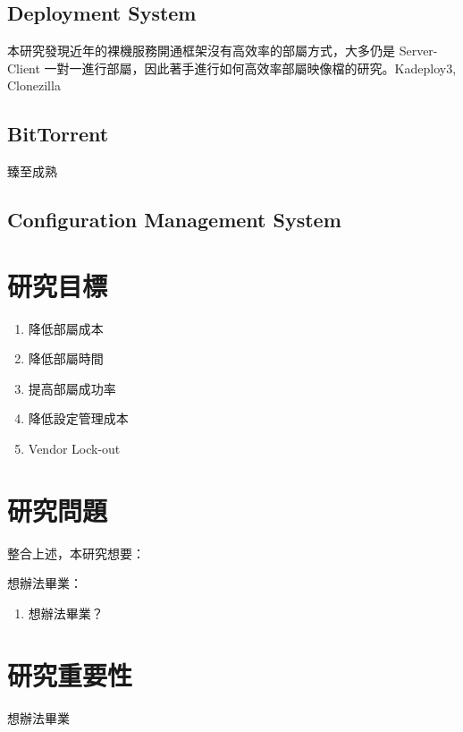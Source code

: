 \subsection{Deployment System}
本研究發現近年的裸機服務開通框架\cite{chandrasekar2014comparative}沒有高效率的部屬方式，大多仍是 Server-Client 一對一進行部屬，因此著手進行如何高效率部屬映像檔的研究。Kadeploy3\cite{kadeploy3}, Clonezilla\cite{shiau2008clonezilla}
\subsection{BitTorrent}
臻至成熟
\subsection{Configuration Management System}

\section{研究目標}
\begin{enumerate}
\item 降低部屬成本
\item 降低部屬時間
\item 提高部屬成功率
\item 降低設定管理成本
\item Vendor Lock-out
\end{enumerate}
\section{研究問題}
整合上述，本研究想要：

\noindent
想辦法畢業：
\begin{enumerate}
\label{q1}
\item 想辦法畢業？
\end{enumerate}



\section{研究重要性} 
想辦法畢業



